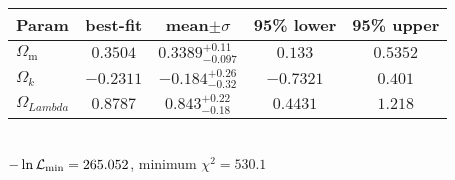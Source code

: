 \begin{tabular}{|l|c|c|c|c|} 
 \hline 
Param & best-fit & mean$\pm\sigma$ & 95\% lower & 95\% upper \\ \hline 
$\Omega_\mathrm{m}$ &$0.3504$ & $0.3389_{-0.097}^{+0.11}$ & $0.133$ & $0.5352$ \\ 
$\Omega{}_{k }$ &$-0.2311$ & $-0.184_{-0.32}^{+0.26}$ & $-0.7321$ & $0.401$ \\ 
$\Omega{}_{Lambda }$ &$0.8787$ & $0.843_{-0.18}^{+0.22}$ & $0.4431$ & $1.218$ \\ 
\hline 
 \end{tabular} \\ 
$-\ln{\cal L}_\mathrm{min} =265.052$, minimum $\chi^2=530.1$ \\ 
